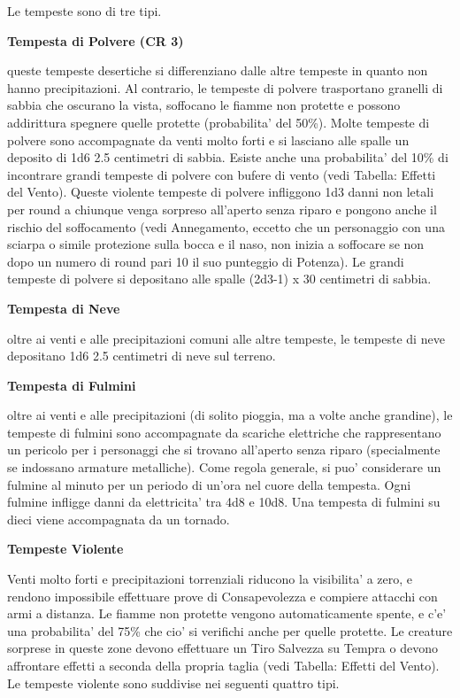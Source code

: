 \documentclass[a4paper,11pt,twoside,openany]{book}
\begin{document}
{		Le tempeste sono di tre tipi.
		
		\textbf{Tempesta di Polvere (CR 3)}
		
		queste tempeste desertiche si differenziano dalle altre tempeste in quanto non hanno precipitazioni. Al contrario, le tempeste di polvere trasportano granelli di sabbia che oscurano la vista, soffocano le fiamme non protette e possono addirittura spegnere quelle protette (probabilita' del 50\%). Molte tempeste di polvere sono accompagnate da venti molto forti e si lasciano alle spalle un deposito di 1d6 \texttimes{} 2.5 centimetri di sabbia.
		Esiste anche una probabilita' del 10\% di incontrare grandi tempeste di polvere con bufere di vento (vedi Tabella: Effetti del Vento). Queste violente tempeste di polvere infliggono 1d3 danni non letali per round a chiunque venga sorpreso all'aperto senza riparo e pongono anche il rischio del soffocamento (vedi Annegamento, eccetto che un personaggio con una sciarpa o simile protezione sulla bocca e il naso, non inizia a soffocare se non dopo un numero di round pari 10 \texttimes{} il suo punteggio di Potenza). Le grandi tempeste di polvere si depositano alle spalle (2d3-1) x 30 centimetri di sabbia.
		
		\textbf{Tempesta di Neve}
		
		oltre ai venti e alle precipitazioni comuni alle altre tempeste, le tempeste di neve depositano 1d6 \texttimes{} 2.5 centimetri di neve sul terreno.
		
		\textbf{Tempesta di Fulmini}
		
		oltre ai venti e alle precipitazioni (di solito pioggia, ma a volte anche grandine), le tempeste di fulmini sono accompagnate da scariche elettriche che rappresentano un pericolo per i personaggi che si trovano all'aperto senza riparo (specialmente se indossano armature metalliche). Come regola generale, si puo' considerare un fulmine al minuto per un periodo di un'ora nel cuore della tempesta. Ogni fulmine infligge danni da elettricita' tra 4d8 e 10d8. Una tempesta di fulmini su dieci viene accompagnata da un tornado.
		
		\textbf{Tempeste Violente}
		
		Venti molto forti e precipitazioni torrenziali riducono la visibilita' a zero, e rendono impossibile effettuare prove di Consapevolezza e compiere attacchi con armi a distanza. Le fiamme non protette vengono automaticamente spente, e c'e' una probabilita' del 75\% che cio' si verifichi anche per quelle protette. Le creature sorprese in queste zone devono effettuare un Tiro Salvezza su Tempra o devono affrontare effetti a seconda della propria taglia (vedi Tabella: Effetti del Vento). Le tempeste violente sono suddivise nei seguenti quattro tipi.
		
}
\end{document}
